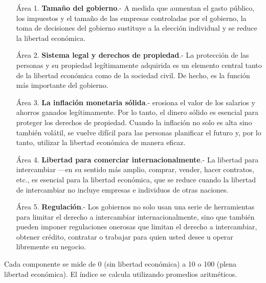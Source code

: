    \begin{enumerate}

	\item[Área 1.] \textbf{Tamaño del gobierno}.- A medida que aumentan el gasto público, los impuestos y el tamaño de las empresas controladas por el gobierno, la toma de decisiones del gobierno sustituye a la elección individual y se reduce la libertad económica.

	\item[Área 2.] \textbf{Sistema legal y derechos de propiedad}.- La protección de las personas y su propiedad legítimamente adquirida es un elemento central tanto de la libertad económica como de la sociedad civil. De hecho, es la función más importante del gobierno.

	\item[Área 3.] \textbf{La inflación monetaria sólida}.- erosiona el valor de los salarios y ahorros ganados legítimamente. Por lo tanto, el dinero sólido es esencial para proteger los derechos de propiedad. Cuando la inflación no solo es alta sino también volátil, se vuelve difícil para las personas planificar el futuro y, por lo tanto, utilizar la libertad económica de manera eficaz.

	\item[Área 4.] \textbf{Libertad para comerciar internacionalmente}.- La libertad para intercambiar —en su sentido más amplio, comprar, vender, hacer contratos, etc., es esencial para la libertad económica, que se reduce cuando la libertad de intercambiar no incluye empresas e individuos de otras naciones.

	\item[Área 5.] \textbf{Regulación}.- Los gobiernos no solo usan una serie de herramientas para limitar el derecho a intercambiar internacionalmente, sino que también pueden imponer regulaciones onerosas que limitan el derecho a intercambiar, obtener crédito, contratar o trabajar para quien usted desee u operar libremente su negocio.

    \end{enumerate}

    Cada componente se mide de 0 (sin libertad económica) a 10 o 100 (plena libertad económica). El índice se calcula utilizando promedios aritméticos.\\

